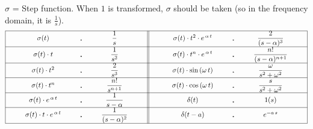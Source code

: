 $\sigma$ = Step function. When $1$ is transformed, $\sigma$ should be taken (so in the frequency domain, it is $\frac{1}{s}$).
\let\DS=\displaystyle
\renewcommand{\arraystretch}{2.5}
{ \[
\begin{array}{|@{\hspace{1cm}}c@{\hspace{1cm}}c@{\hspace{1cm}}c@{\hspace{1cm}}||c@{\hspace{1cm}}c@{\hspace{1cm}}c@{\hspace{1cm}}c@{\hspace{1cm}}|}
\hline
\sigma(t) & \FT & \DS\frac{1}{s} &&\sigma(t)\cdot t^2\cdot e^{\,\alpha\,t} & \FT & \DS\frac{2}{(s-\alpha)^3} \\
\hline
\sigma(t)\cdot t & \FT & \DS\frac{1}{s^2} &&\sigma(t)\cdot t^n\cdot e^{\,\alpha\,t} & \FT & \DS\frac{n!}{(s-\alpha)^{n+1}} \\
\hline
\sigma(t)\cdot t^2 & \FT & \DS\frac{2}{s^3} &&\sigma(t)\cdot\sin\,(\omega\,t) & \FT & \DS\frac{\omega}{s^2+\omega^2} \\
\hline
\sigma(t)\cdot t^n & \FT & \DS\frac{n!}{s^{n+1}} &&\sigma(t)\cdot\cos\,(\omega\,t) & \FT & \DS\frac{s}{s^2+\omega^2} \\
\hline
\sigma(t)\cdot e^{\,\alpha\,t} & \FT & \DS\frac{1}{s-\alpha} &&\delta(t) & \FT & 1(s) \\
\hline
\sigma(t)\cdot t\cdot e^{\,\alpha\,t} & \FT & \DS\frac{1}{(s-\alpha)^2} &&\delta(t-a) & \FT & e^{-a\,s} \\
\hline
\end{array} \] }
